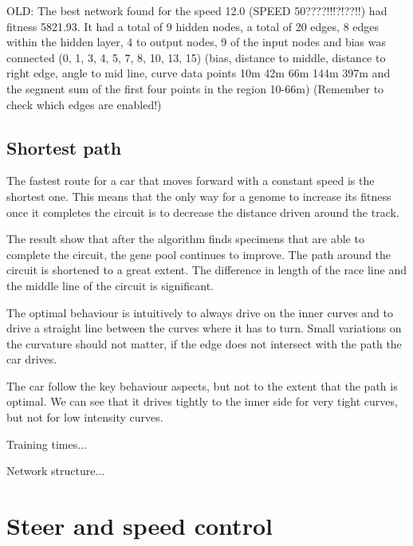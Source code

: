 OLD: The best network found for the speed 12.0 (SPEED 50????!!!?!??!!) had fitness 5821.93. It had a total of 9 hidden nodes, a total of 20 edges, 8 edges within the hidden layer, 4 to output nodes, 9 of the input nodes and bias was connected (0, 1, 3, 4, 5, 7, 8, 10, 13, 15) (bias, distance to middle, distance to right edge, angle to mid line, curve data points 10m 42m 66m 144m 397m and the segment sum of the first four points in the region 10-66m) (Remember to check which edges are enabled!)


\subsection{Shortest path}

The fastest route for a car that moves forward with a constant speed is the shortest one. This means that the only way for a genome to increase its fitness once it completes the circuit is to decrease the distance driven around the track.  

The result show that after the algorithm finds specimens that are able to complete the circuit, the gene pool continues to improve. The path around the circuit is shortened to a great extent. The difference in length of the race line and the middle line of the circuit is significant. 

The optimal behaviour is intuitively to always drive on the inner curves and to drive a straight line between the curves where it has to turn. Small variations on the curvature should not matter, if the edge does not intersect with the path the car drives.

The car follow the key behaviour aspects, but not to the extent that the path is optimal. We can see that it drives tightly to the inner side for very tight curves, but not for low intensity curves.

Training times...

Network structure...



\section{Steer and speed control}


